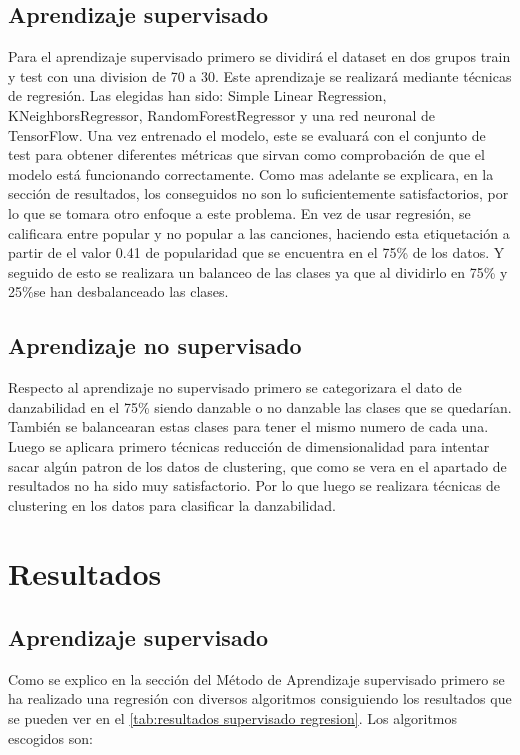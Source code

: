 \documentclass{wsdcr}
\begin{document}
\subsection{Aprendizaje supervisado}
Para el aprendizaje supervisado primero se dividirá el dataset en dos grupos train y test con una division de 70 a 30. Este aprendizaje se realizará mediante técnicas de regresión. Las elegidas han sido: Simple Linear Regression, KNeighborsRegressor, RandomForestRegressor y una red neuronal de TensorFlow. Una vez entrenado el modelo, este se evaluará con el conjunto de test para obtener diferentes métricas que sirvan como comprobación de que el modelo está funcionando correctamente.
Como mas adelante se explicara, en la sección de resultados, los conseguidos no son lo suficientemente satisfactorios, por lo que se tomara otro enfoque a este problema. En vez de usar regresión, se calificara entre popular y no popular a las canciones, haciendo esta etiquetación a partir de el valor 0.41 de popularidad que se encuentra en el 75\% de los datos. Y seguido de esto se realizara un balanceo de las clases ya que al dividirlo en 75\% y 25\%se han desbalanceado las clases.

\subsection{Aprendizaje no supervisado}
Respecto al aprendizaje no supervisado primero se categorizara el dato de danzabilidad en el 75\% siendo danzable o no danzable las clases que se quedarían. También se balancearan estas clases para tener el mismo numero de cada una. Luego se aplicara primero técnicas reducción de dimensionalidad para intentar sacar algún patron de los datos de clustering, que como se vera en el apartado de resultados no ha sido muy satisfactorio. Por lo que luego se realizara técnicas de clustering en los datos para clasificar la danzabilidad.

\section{Resultados}
\subsection{Aprendizaje supervisado}
Como se explico en la sección del Método de Aprendizaje supervisado primero se ha realizado una regresión con diversos algoritmos consiguiendo los resultados que se pueden ver en el \tablename{\ref{tab:resultados supervisado regresion}}.
Los algoritmos escogidos son:
\end{document}
